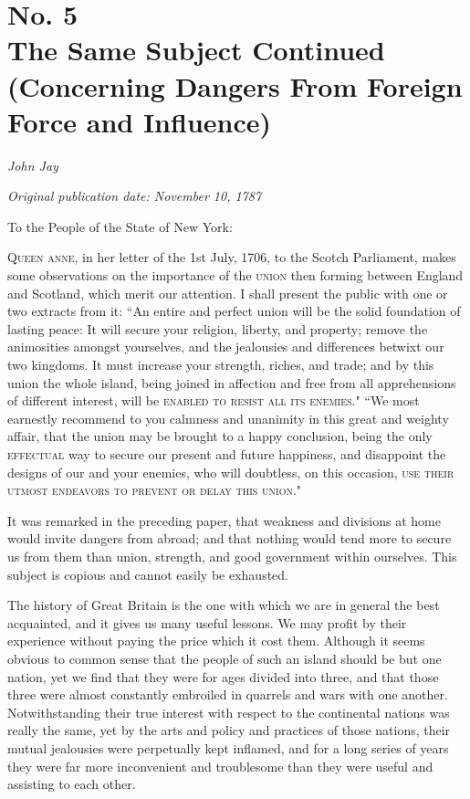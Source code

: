 \chapter[No. 5: The Same Subject Continued (Concerning Dangers From Foreign Force and Influence)]{No. 5\\ {\small The Same Subject Continued (Concerning Dangers From Foreign Force and Influence)}}

\textit{John Jay}

\textit{Original publication date: November 10, 1787}
\vspace{1cm}

To the People of the State of New York:
\vspace{.4cm}

\textsc{Queen anne}, in her letter of the 1st July, 1706, to the Scotch Parliament, makes some observations on the importance of the \textsc{union} then forming between England and Scotland, which merit our attention. 
I shall present the public with one or two extracts from it: ``An entire and perfect union will be the solid foundation of lasting peace: It will secure your religion, liberty, and property; remove the animosities amongst yourselves, and the jealousies and differences betwixt our two kingdoms. 
It must increase your strength, riches, and trade; and by this union the whole island, being joined in affection and free from all apprehensions of different interest, will be \textsc{enabled to resist all its enemies}." ``We most earnestly recommend to you calmness and unanimity in this great and weighty affair, that the union may be brought to a happy conclusion, being the only \textsc{effectual} way to secure our present and future happiness, and disappoint the designs of our and your enemies, who will doubtless, on this occasion, \textsc{use their utmost endeavors to prevent or delay this union}."

It was remarked in the preceding paper, that weakness and divisions at home would invite dangers from abroad; and that nothing would tend more to secure us from them than union, strength, and good government within ourselves. 
This subject is copious and cannot easily be exhausted.

The history of Great Britain is the one with which we are in general the best acquainted, and it gives us many useful lessons. 
We may profit by their experience without paying the price which it cost them. 
Although it seems obvious to common sense that the people of such an island should be but one nation, yet we find that they were for ages divided into three, and that those three were almost constantly embroiled in quarrels and wars with one another. 
Notwithstanding their true interest with respect to the continental nations was really the same, yet by the arts and policy and practices of those nations, their mutual jealousies were perpetually kept inflamed, and for a long series of years they were far more inconvenient and troublesome than they were useful and assisting to each other.

